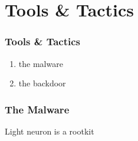 \section{Tools \& Tactics}

\begin{frame}
    \frametitle{Tools \& Tactics}
    \begin{enumerate}
        \item the malware
        \item the backdoor
    \end{enumerate}
\end{frame}

\begin{frame}
    \frametitle{The Malware}
    Light neuron is a rootkit
\end{frame}